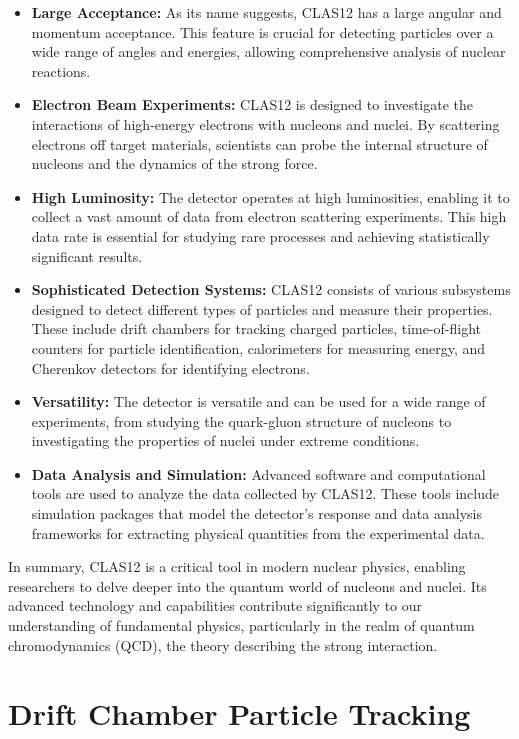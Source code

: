 \documentclass[a4paper,11pt]{article}
\begin{document}
\begin{itemize}

\item{\bf Large Acceptance: } As its name suggests, CLAS12 has a large angular and momentum acceptance. This feature is crucial for detecting particles over a wide range of angles and energies, allowing comprehensive analysis of nuclear reactions.
\item{\bf Electron Beam Experiments:} CLAS12 is designed to investigate the interactions of high-energy electrons with nucleons and nuclei. By scattering electrons off target materials, scientists can probe the internal structure of nucleons and the dynamics of the strong force.
\item{\bf High Luminosity:} The detector operates at high luminosities, enabling it to collect a vast amount of data from electron scattering experiments. This high data rate is essential for studying rare processes and achieving statistically significant results.
\item{\bf Sophisticated Detection Systems:} CLAS12 consists of various subsystems designed to detect different types of particles and measure their properties. These include drift chambers for tracking charged particles, time-of-flight counters for particle identification, calorimeters for measuring energy, and Cherenkov detectors for identifying electrons.
\item{\bf Versatility:} The detector is versatile and can be used for a wide range of experiments, from studying the quark-gluon structure of nucleons to investigating the properties of nuclei under extreme conditions.
\item{\bf Data Analysis and Simulation:} Advanced software and computational tools are used to analyze the data collected by CLAS12. These tools include simulation packages that model the detector's response and data analysis frameworks for extracting physical quantities from the experimental data.
\end{itemize}
In summary, CLAS12 is a critical tool in modern nuclear physics, enabling researchers to delve deeper into the quantum world of nucleons and nuclei. Its advanced technology and capabilities contribute significantly to our understanding of fundamental physics, particularly in the realm of quantum chromodynamics (QCD), the theory describing the strong interaction.

\section{Drift Chamber Particle Tracking}
\end{document}
